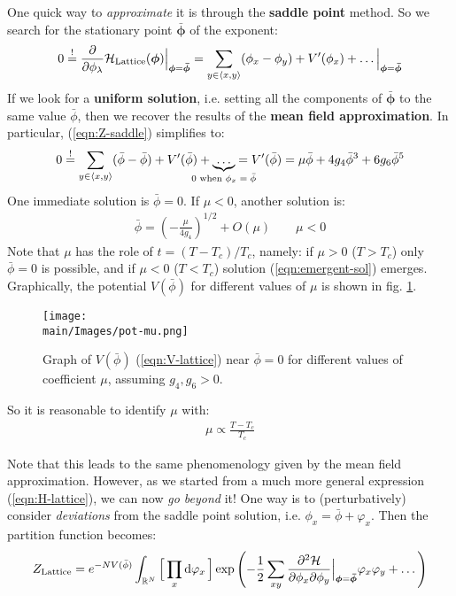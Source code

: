 \documentclass[../../main.tex]{subfiles}
\begin{document}
One quick way to \textit{approximate} it is through the \textbf{saddle point} method. So we search for the stationary point $\bm{\bar{\phi}}$ of the exponent:
\begin{align}\label{eqn:Z-saddle}
    0 \overset{!}{=}  \pdv{\phi_\lambda} \mathcal{H}_{\mathrm{Lattice}}(\bm{\phi})\Big|_{\bm{\phi} = \bm{\bar{\phi}}} = \sum_{y \in \langle x,y \rangle} (\phi_x - \phi_y) + V'(\phi_x) + \dots \Big|_{\bm{\phi} = \bm{\bar{\phi}}}
\end{align}  
If we look for a \textbf{uniform solution}, i.e. setting all the components of $\bm{\bar{\phi}}$ to the same value $\bar{\phi}$, then we recover the results of the \textbf{mean field approximation}. In particular, (\ref{eqn:Z-saddle}) simplifies to:
\begin{align*}
    0 \overset{!}{=}  \sum_{y \in \langle x,y \rangle} (\bar{\phi} - \bar{\phi}) + V'(\bar{\phi}) + \underbrace{\dots}_{\mathclap{0 \text{ when $\phi_x = \bar{\phi}$}}} = V'(\bar{\phi}) = \mu \bar{\phi} + 4 g_4 \bar{\phi}^3 + 6g_6 \bar{\phi}^5
\end{align*}
One immediate solution is $\bar{\phi} = 0$. If $\mu < 0$, another solution is:
\begin{align}\label{eqn:emergent-sol}
    \bar{\phi} = \left(-\frac{\mu}{4 g_4} \right)^{1/2} + O(\mu) \qquad \mu < 0
\end{align}
Note that $\mu$ has the role of $t = (T-T_c)/T_c$, namely: if $\mu > 0$ ($T>T_c$) only $\bar{\phi} = 0$ is possible, and if $\mu < 0$ ($T < T_c$) solution (\ref{eqn:emergent-sol}) emerges. Graphically, the potential $V(\bar{\phi})$ for different values of $\mu$ is shown in fig. \ref{fig:pot-mu}.

\begin{figure}[H]
    \centering
    \texttt{[image: \\main/Images/pot-mu.png]}
    \caption{Graph of $V(\bar{\phi})$ (\ref{eqn:V-lattice}) near $\bar{\phi}=0$ for different values of coefficient $\mu$, assuming $g_4, g_6 > 0$.}
    \label{fig:pot-mu}
\end{figure}

So it is reasonable to identify $\mu$ with:
\begin{align*}
    \mu \propto \frac{T-T_c}{T_c} 
\end{align*}

Note that this leads to the same phenomenology given by the mean field approximation. However, as we started from a much more general expression (\ref{eqn:H-lattice}), we can now \textit{go beyond} it! One way is to (perturbatively) consider \textit{deviations} from the saddle point solution, i.e. $\phi_x = \bar{\phi} + \varphi_x$. Then the partition function becomes:
\begin{align*}
    Z_{\mathrm{Lattice}} = e^{-N V(\bar{\phi})} \int_{\mathbb{R}^N} \Big[\prod_x \dd{\varphi_x}\Big] \exp\left(-\frac{1}{2} \sum_{xy} \pdv[2]{\mathcal{H}}{\phi_x}{\phi_y} \Big|_{\bm{\phi} = \bm{\bar{\phi}}} \varphi_x \varphi_y + \dots \right)
\end{align*}  
\end{document}
